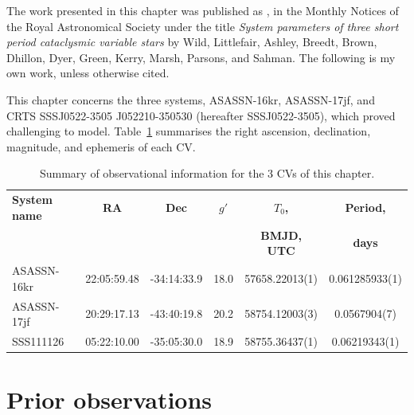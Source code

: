 \label{chpt:three peculiar white dwarfs} %


The work presented in this chapter was published as \cite{wild2021}, in the Monthly Notices of the Royal Astronomical Society under the title \textit{System parameters of three short period cataclysmic variable stars} by Wild, Littlefair, Ashley, Breedt, Brown, Dhillon, Dyer, Green, Kerry, Marsh, Parsons, and Sahman.
The following is my own work, unless otherwise cited.

This chapter concerns the three systems, ASASSN-16kr, ASASSN-17jf, and CRTS SSSJ0522-3505 J052210-350530 (hereafter SSSJ0522-3505), which proved challenging to model.
Table~\ref{table:three white dwarfs:observational data} summarises the right ascension, declination, magnitude, and ephemeris of each CV.

    \begin{table}
        \centering
        \caption{Summary of observational information for the 3 CVs of this chapter. }
        \label{table:three white dwarfs:observational data}
        \begin{tabular}{lccccc}
            \hline
            {\bf System name} & {\bf RA} & {\bf Dec} & {\bf $g'$}      & {\bf $T_0$,}    & {\bf Period,} \\
                              &          &           &                 & {\bf BMJD, UTC} & {\bf days}      \\
            \hline
            \hline
            ASASSN-16kr     & 22:05:59.48 & -34:14:33.9 & 18.0 & 57658.22013(1) & 0.061285933(1) \\
            ASASSN-17jf     & 20:29:17.13 & -43:40:19.8 & 20.2 & 58754.12003(3) & 0.0567904(7) \\
            SSS111126       & 05:22:10.00 & -35:05:30.0 & 18.9 & 58755.36437(1) & 0.06219343(1) \\
            \hline
        \end{tabular}
    \end{table}

\section{Prior observations}
\label{sect:three white dwarfs:prior observations}

